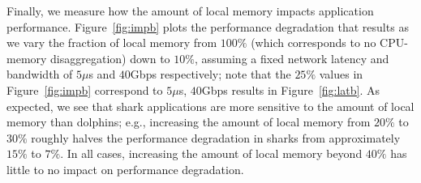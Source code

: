 Finally, we measure how the amount of local memory impacts application performance.
Figure~\ref{fig:impb} plots the performance degradation that results as we vary the fraction of local memory from $100\%$ (which corresponds to no CPU-memory disaggregation) down to $10\%$, assuming a fixed network latency and bandwidth of $5\mu$s and $40$Gbps respectively; note that the $25\%$ values in Figure~\ref{fig:impb} correspond to $5\mu$s, $40$Gbps results in Figure~\ref{fig:latb}. 
As expected, we see that shark applications are more sensitive to the amount of local memory than dolphins; e.g., increasing the amount of local memory from $20\%$ to $30\%$ roughly halves the performance degradation in sharks from approximately $15\%$ to $7\%$.
In all cases, increasing the amount of local memory beyond $40\%$ has little to no impact on performance degradation.
%
